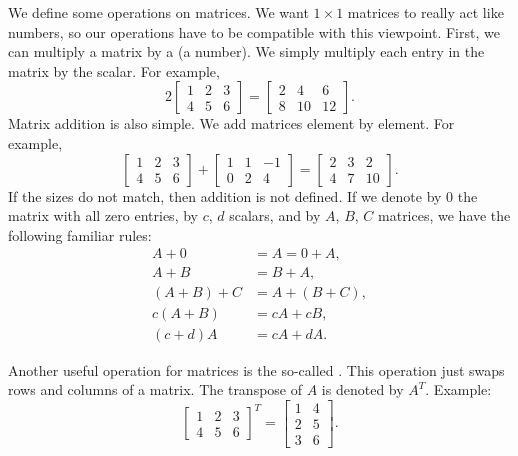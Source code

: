 We define some operations on matrices.  We 
want $1 \times 1$ matrices to really act like numbers, so our operations
have to be compatible with this viewpoint.
First, we can multiply a matrix by
a \emph{} (a number).
We simply multiply each entry in the matrix by the scalar.  For example,
\begin{equation*}
2
\begin{bmatrix}
1 & 2 & 3 \\
4 & 5 & 6
\end{bmatrix} =
\begin{bmatrix}
2 & 4 & 6 \\
8 & 10 & 12
\end{bmatrix} .
\end{equation*}
Matrix addition is also simple.
We add matrices element by element.
For example,
\begin{equation*}
\begin{bmatrix}
1 & 2 & 3 \\
4 & 5 & 6
\end{bmatrix} +
\begin{bmatrix}
1 & 1 & -1 \\
0 & 2 & 4
\end{bmatrix}
=
\begin{bmatrix}
2 & 3 & 2 \\
4 & 7 & 10
\end{bmatrix} .
\end{equation*}
If the sizes do not match, then addition is not defined.
If we denote by 0 the matrix with all zero entries, by
$c$, $d$ scalars, and by $A$, $B$, $C$ matrices, we
have the following familiar rules:
\begin{align*}
A + 0 & = A = 0 + A , \\
A + B & = B + A , \\
(A + B) + C & = A + (B + C) , \\
c(A+B) & = cA+cB, \\
(c+d)A & = cA + dA.
\end{align*}

Another useful operation for matrices is the so-called
\emph{}.  This operation just swaps rows and columns of a
matrix.
The transpose of $A$ is denoted by $A^T$.  Example:
\begin{equation*}
\begin{bmatrix}
1 & 2 & 3 \\
4 & 5 & 6
\end{bmatrix}^T =
\begin{bmatrix}
1 & 4 \\
2 & 5 \\
3 & 6 
\end{bmatrix}
.
\end{equation*}

